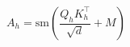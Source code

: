 \documentclass{article}
\begin{document}
\begin{preview}

\[ A_h = \mathrm{sm}\!\left(\dfrac{Q_h K_h^\top}{\sqrt d} + M\right) \]

\end{preview}
\end{document}
